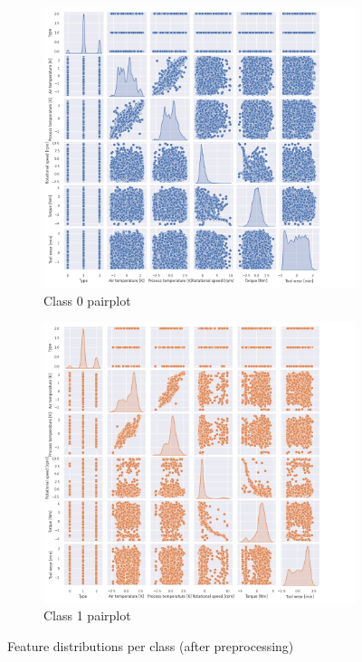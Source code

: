 \begin{frame}{\subsecname}

\begin{figure}
    \centering
    \begin{subfigure}[c]{0.5\textwidth}
        \includegraphics[width=\linewidth]{images/pairplot0.png}
        \caption{Class 0 pairplot}
        \label{fig:pairplot_0}
    \end{subfigure}\hfill
    \begin{subfigure}[c]{0.5\textwidth}
        \includegraphics[width=\linewidth]{images/pariplot1.png}
        \caption{Class 1 pairplot}
        \label{fig:pairplot_1}
    \end{subfigure}
    \caption{Feature distributions per class (after preprocessing)}
    \label{fig:pairplots}
\end{figure}
\end{frame}

